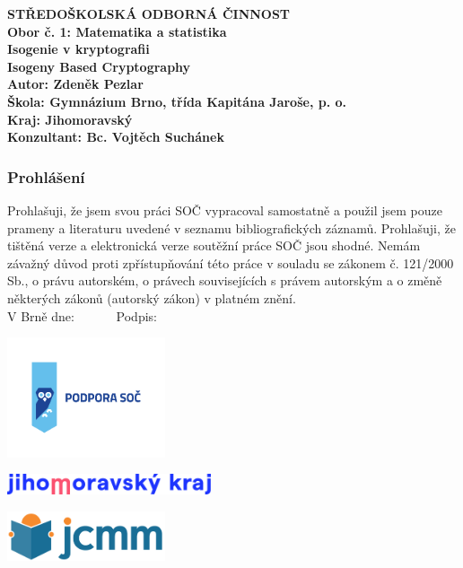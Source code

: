 \documentclass [12pt]{report}
\begin{document}
\begin{titlepage}
{
\centering
\LARGE \textbf{STŘEDOŠKOLSKÁ ODBORNÁ ČINNOST}\\
\Large\textbf{Obor č. 1: Matematika a statistika}\\
\vspace{6cm}
\LARGE\textbf{Isogenie v kryptografii}\\
\vspace{1cm}
\LARGE\textbf{Isogeny Based Cryptography}\\
}
\vspace{6cm}
{\noindent\large\bfseries Autor: Zdeněk Pezlar\\ 
	\large\bfseries Škola: Gymnázium Brno, třída Kapitána Jaroše, p. o.\\
    \large\bfseries Kraj: Jihomoravský \\
	\large\bfseries Konzultant: Bc. Vojtěch Suchánek\\}

\end{titlepage}

\newpage
\thispagestyle{empty}
\vspace*{14cm}
\subsubsection*{Prohlášení}

Prohlašuji, že jsem svou práci SOČ vypracoval samostatně a použil jsem pouze prameny a literaturu uvedené v seznamu bibliografických záznamů.
Prohlašuji, že tištěná verze a elektronická verze soutěžní práce SOČ jsou shodné. 
Nemám závažný důvod proti zpřístupňování této práce v souladu se zákonem č. 121/2000 Sb., o právu autorském, o právech souvisejících s právem autorským a o změně některých zákonů (autorský zákon) v platném znění. \\[1cm]
V Brně dne: \dotfill \ \ \ \ \ \  Podpis: \dotfill

\newpage
\thispagestyle{empty}
\begin{center}
\includegraphics[width=0.35\textwidth]{podpora_soc-horizontalni.png}
\end{center}
\begin{center}
\includegraphics[width=0.45\textwidth]{logo_JMK_pruhledne.png}
\end{center}
\vspace*{0.7cm}
\begin{center}
\includegraphics[width=0.35\textwidth]{jcmm-logotype-positive1.png}
\end{center}
\vspace*{9.5cm}
\end{document}
